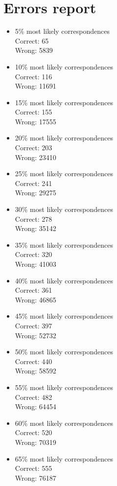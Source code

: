 \documentclass{article}
\begin{document}
\section{Errors report}
\begin{itemize}
\item{5\% most likely correspondences} \\ Correct: 65\\ Wrong: 5839
\item{10\% most likely correspondences} \\ Correct: 116\\ Wrong: 11691
\item{15\% most likely correspondences} \\ Correct: 155\\ Wrong: 17555
\item{20\% most likely correspondences} \\ Correct: 203\\ Wrong: 23410
\item{25\% most likely correspondences} \\ Correct: 241\\ Wrong: 29275
\item{30\% most likely correspondences} \\ Correct: 278\\ Wrong: 35142
\item{35\% most likely correspondences} \\ Correct: 320\\ Wrong: 41003
\item{40\% most likely correspondences} \\ Correct: 361\\ Wrong: 46865
\item{45\% most likely correspondences} \\ Correct: 397\\ Wrong: 52732
\item{50\% most likely correspondences} \\ Correct: 440\\ Wrong: 58592
\item{55\% most likely correspondences} \\ Correct: 482\\ Wrong: 64454
\item{60\% most likely correspondences} \\ Correct: 520\\ Wrong: 70319
\item{65\% most likely correspondences} \\ Correct: 555\\ Wrong: 76187

\end{itemize}
\end{document}
